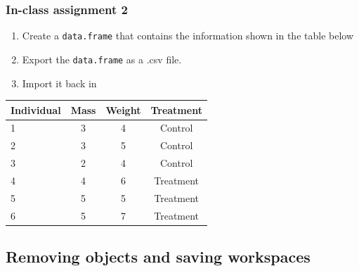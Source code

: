 \documentclass[color=usenames,dvipsnames]{beamer}\usepackage[]{graphicx}\usepackage[]{color}
\begin{document}
\begin{frame}[fragile]
  \frametitle{In-class assignment 2}
  \begin{enumerate}[\bf (1)]
    \item Create a \verb+data.frame+ that contains the information shown in the table below
    \item Export the \verb+data.frame+ as a .csv file.
    \item Import it back in
  \end{enumerate}
  \begin{center}
    \begin{tabular}{lccc}
      \hline
      Individual & Mass & Weight & Treatment \\
      \hline
      1 & 3 & 4 & Control \\
      2 & 3 & 5 & Control \\
      3 & 2 & 4 & Control \\
      4 & 4 & 6 & Treatment \\
      5 & 5 & 5 & Treatment \\
      6 & 5 & 7 & Treatment \\
      \hline
    \end{tabular}
  \end{center}
\end{frame}





\subsection{Removing objects and saving workspaces}
\end{document}

